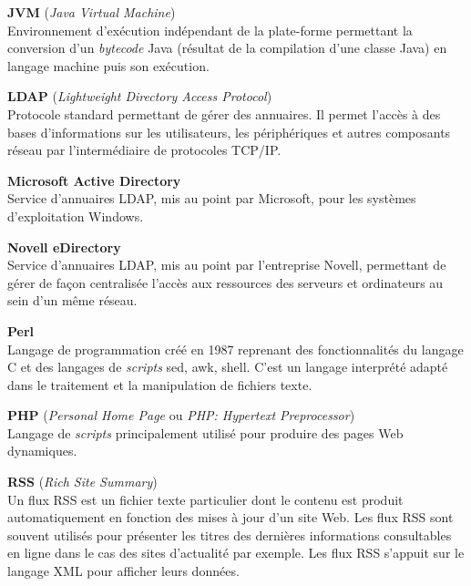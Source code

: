 \vspace{0.5cm}

\textbf{JVM} (\textit{Java Virtual Machine})\\
Environnement d'ex\'ecution ind\'ependant de la plate-forme permettant la conversion d'un \textit{bytecode} Java (r\'esultat de la compilation d'une classe Java) en langage machine puis son ex\'ecution.

\vspace{0.5cm}

\textbf{LDAP} (\textit{Lightweight Directory Access Protocol})\\
Protocole standard permettant de g\'erer des annuaires. 
Il permet l'acc\`es \`a des bases d'informations sur les utilisateurs, les p\'eriph\'eriques et autres composants r\'eseau par l'interm\'ediaire de protocoles TCP/IP.

\vspace{0.5cm}

\textbf{Microsoft Active Directory}\\
Service d'annuaires LDAP, mis au point par Microsoft, pour les syst\`emes d'exploitation Windows.

\vspace{0.5cm}

\textbf{Novell eDirectory}\\
Service d'annuaires LDAP, mis au point par l'entreprise Novell, permettant de g\'erer de fa\c{c}on centralis\'ee l'acc\`es aux ressources des serveurs et ordinateurs au sein d'un m\^eme r\'eseau.

\vspace{0.5cm}

\textbf{Perl}\\
Langage de programmation cr\'e\'e en 1987 reprenant des fonctionnalit\'es du langage C et des langages de \textit{scripts} sed, awk, shell.
C'est un langage interpr\'et\'e adapt\'e dans le traitement et la manipulation de fichiers texte.

\vspace{0.5cm}

\textbf{PHP} (\textit{Personal Home Page} ou \textit{PHP: Hypertext Preprocessor})\\
Langage de \textit{scripts} principalement utilis\'e pour produire des pages Web dynamiques.

\vspace{0.5cm}

\textbf{RSS} (\textit{Rich Site Summary})\\
Un flux RSS est un fichier texte particulier dont le contenu est produit automatiquement en fonction des mises \`a jour d'un site Web.
Les flux RSS sont souvent utilis\'es pour pr\'esenter les titres des derni\`eres informations consultables en ligne dans le cas des sites d'actualit\'e par exemple.
Les flux RSS s'appuit sur le langage XML pour afficher leurs donn\'ees.

